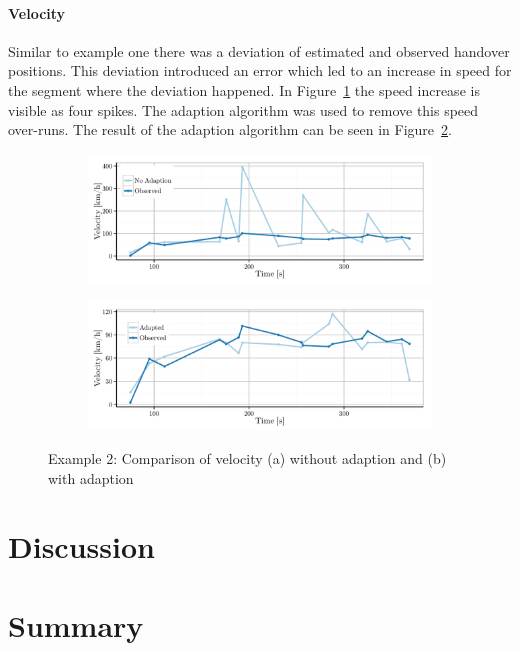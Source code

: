 \documentclass[master,english]{hgbthesis}
\begin{document}
\subsubsection{Velocity}
Similar to example one there was a deviation of estimated and observed handover positions. This deviation introduced an error which led to an increase in speed for the segment where the deviation happened. In Figure~\ref{fig:1058_velocityNoAdapt} the speed increase is visible as four spikes. The adaption algorithm was used to remove this speed over-runs. The result of the adaption algorithm can be seen in Figure~\ref{fig:1058_velocityAdapt}.
\begin{figure}
	\centering
	\begin{subfigure}[b]{\textwidth}
		\includegraphics[width=\textwidth]{./images/1058_velocityNoAdapt}
		\caption{}
		\label{fig:1058_velocityNoAdapt}
	\end{subfigure}%
	\begin{subfigure}[b]{\textwidth}
		\includegraphics[width=\textwidth]{./images/1058_velocityAdapt}
		\caption{}
		\label{fig:1058_velocityAdapt}
	\end{subfigure}
	\caption{Example 2: Comparison of velocity (a) without adaption  and (b) with adaption}\label{fig:1058velocity}
\end{figure}
\chapter{Discussion}%
\chapter{Summary}%


\MakeBibliography
\end{document}
